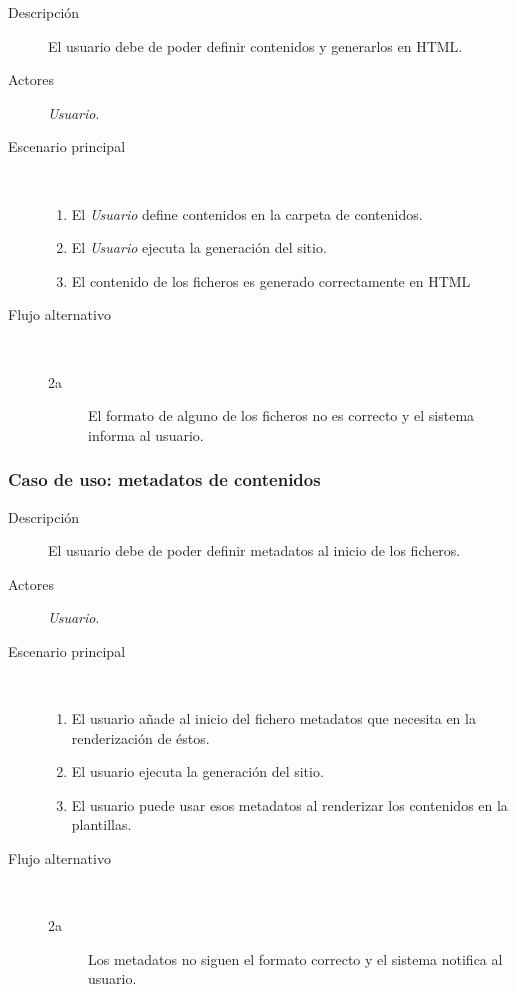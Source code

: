 \begin{description}
    \item[Descripción] El usuario debe de poder definir contenidos y generarlos en HTML.
    \item[Actores] \textit{Usuario}.
    \item[Escenario principal] $\quad$
        \begin{enumerate}
            \item El \textit{Usuario} define contenidos en la carpeta de contenidos.
            \item El \textit{Usuario} ejecuta la generación del sitio.
            \item El contenido de los ficheros es generado correctamente en HTML
        \end{enumerate}
    \item[Flujo alternativo] $\quad$
        \begin{description}
            \item[2a] El formato de alguno de los ficheros no es correcto y el sistema informa al usuario.
        \end{description}
\end{description}

\subsubsection{Caso de uso: metadatos de contenidos}

\begin{description}
    \item[Descripción] El usuario debe de poder definir metadatos al inicio de los ficheros.
    \item[Actores] \textit{Usuario}.
    \item[Escenario principal] $\quad$
        \begin{enumerate}
            \item El usuario añade al inicio del fichero metadatos que necesita en la renderización de éstos.
            \item El usuario ejecuta la generación del sitio.
            \item El usuario puede usar esos metadatos al renderizar los contenidos en la plantillas.
        \end{enumerate}
    \item[Flujo alternativo] $\quad$
        \begin{description}
            \item[2a] Los metadatos no siguen el formato correcto y el sistema notifica al usuario.
        \end{description}
\end{description}

